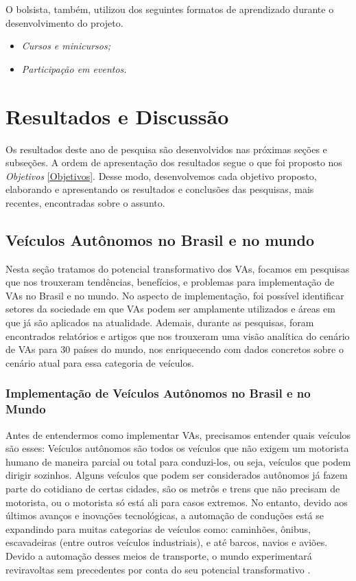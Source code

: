 \vspace {0,5cm}

O bolsista, também, utilizou dos seguintes formatos de aprendizado durante o desenvolvimento do projeto.
\begin{itemize}
\item \textit{Cursos e minicursos;}
\item \textit{Participação em eventos.}
\end{itemize}

\newpage

\chapter{Resultados e Discussão} \label{resultados}

Os resultados deste ano de pesquisa são desenvolvidos nas próximas seções e subseções. A ordem de apresentação dos resultados segue o que foi proposto nos \textit{Objetivos} \ref{Objetivos}. Desse modo, desenvolvemos cada objetivo proposto, elaborando e apresentando os resultados e conclusões das pesquisas, mais recentes, encontradas sobre o assunto.

\section{Veículos Autônomos no Brasil e no mundo}

Nesta seção tratamos do potencial transformativo dos VAs, focamos em pesquisas que nos trouxeram tendências, benefícios, e problemas para implementação de VAs no Brasil e no mundo. No aspecto de implementação, foi possível identificar setores da sociedade em que VAs podem ser amplamente utilizados e áreas em que já são aplicados na atualidade. Ademais, durante as pesquisas, foram encontrados relatórios e artigos que nos trouxeram uma visão analítica do cenário de VAs para 30 países do mundo, nos enriquecendo com dados concretos sobre o cenário atual para essa categoria de veículos. 

\subsection{Implementação de Veículos Autônomos no Brasil e no Mundo}

Antes de entendermos como implementar VAs, precisamos entender quais veículos são esses: Veículos autônomos são todos os veículos que não exigem um motorista humano de maneira parcial ou total para conduzi-los, ou seja, veículos que podem dirigir sozinhos. Alguns veículos que podem ser considerados autônomos já fazem parte do cotidiano de certas cidades, são os metrôs e trens que não precisam de motorista, ou o motorista só está ali para casos extremos. No entanto, devido aos últimos avanços e inovações tecnológicas, a automação de conduções está se expandindo para muitas categorias de veículos como: caminhões, ônibus, escavadeiras (entre outros veículos industriais), e até barcos, navios e aviões. Devido a automação desses meios de transporte, o mundo experimentará reviravoltas sem precedentes por conta do seu potencial transformativo \cite{4cenarios_ocidental}.

